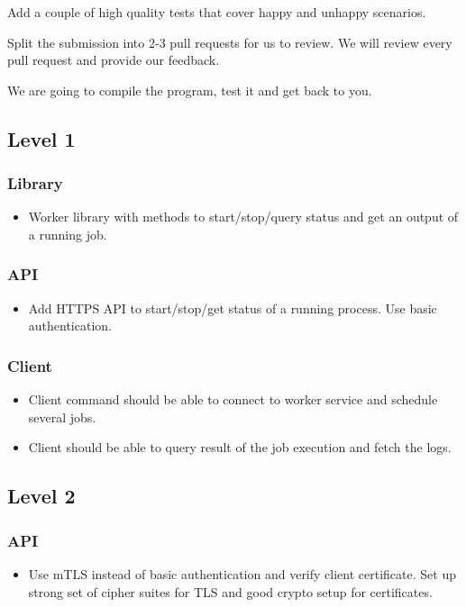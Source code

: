 \documentclass{article}
\begin{document}
  Add a couple of high quality tests that cover happy and unhappy scenarios.

  Split the submission into 2-3 pull requests for us to review. We will review every pull request and provide our feedback.

  We are going to compile the program, test it and get back to you.
  
  \subsection*{Level 1}

  \subsubsection*{Library}
  \begin{itemize} 
  \item[] Worker library with methods to start/stop/query status and get an output of a running job.
  \end{itemize}

  \subsubsection*{API}
  \begin{itemize} 
  \item[] Add HTTPS API to start/stop/get status of a running process. Use basic authentication.
  \end{itemize}

  \subsubsection*{Client}
  \begin{itemize} 
  \item[] Client command should be able to connect to worker service and schedule several jobs.
  \item[] Client should be able to query result of the job execution and fetch the logs.
  \end{itemize}    
    
 \subsection*{Level 2}

 \subsubsection*{API}
 \begin{itemize} 
 \item[] Use mTLS instead of basic authentication and verify client certificate. Set up strong set of cipher suites for TLS and good crypto setup for certificates.
 \end{itemize}
\end{document}
